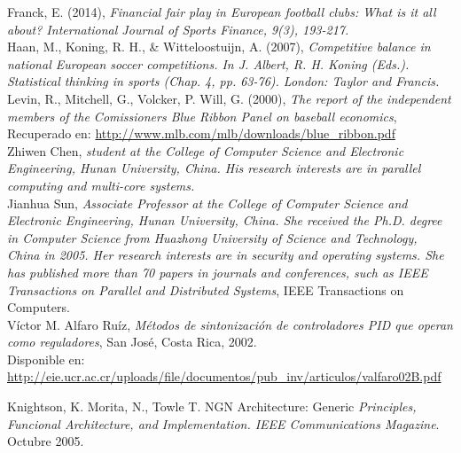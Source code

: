 \documentclass[conference,letterpaper]{IEEEtran}
\begin{document}
\begin{thebibliography}{1}
\normalsize
\bibitem{}
Franck, E. (2014), \emph{Financial fair play in European football clubs: What is it all about? International Journal of Sports Finance, 9(3), 193-217.}
\\
\bibitem{}
Haan, M., Koning, R. H., & Witteloostuijn, A. (2007), \emph{Competitive balance in national European soccer competitions. In J. Albert, R. H. Koning (Eds.). Statistical thinking in sports (Chap. 4, pp. 63-76). London: Taylor and Francis.}
\\
\bibitem{}
Levin, R., Mitchell, G., Volcker, P. Will, G. (2000), \emph{The report of the independent members of the Comissioners Blue Ribbon Panel on baseball economics},\\ Recuperado en: 
\url{http://www.mlb.com/mlb/downloads/blue\_ribbon.pdf}
\\
\bibitem{}
Zhiwen Chen, \emph{ student at the College of Computer Science and Electronic Engineering, Hunan University, China. His research interests are in parallel computing and multi-core systems.} 
\\
\bibitem{}
Jianhua Sun, \emph{Associate Professor at the College of Computer Science and Electronic Engineering, Hunan University, China. She received the Ph.D. degree in Computer Science from Huazhong University of Science and Technology, China in 2005. Her research interests are in security and operating systems. She has published more than 70 papers in journals and conferences, such as IEEE Transactions on Parallel and Distributed Systems}, IEEE Transactions on Computers.
\\
\bibitem{}
Víctor M. Alfaro Ruíz, \emph{Métodos de sintonización de controladores PID que operan como reguladores}, San José, Costa Rica, 2002.\\ Disponible en: 
\url{http://eie.ucr.ac.cr/uploads/file/documentos/pub_inv/articulos/valfaro02B.pdf}

\bibitem{}
Knightson, K. Morita, N., Towle T. NGN Architecture: Generic \emph{Principles, Funcional Architecture, and Implementation. IEEE Communications Magazine}. Octubre 2005.
\end{thebibliography}
\end{document}

